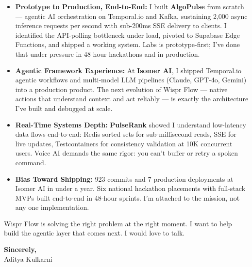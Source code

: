 \documentclass[11pt,letterpaper]{article}
\begin{document}
\begin{itemize}[leftmargin=*, itemsep=3pt, label={\color{WisprNavy}\faAngleRight}]
    \item \textbf{Prototype to Production, End-to-End:} I built \textbf{AlgoPulse} from scratch --- agentic AI orchestration on Temporal.io and Kafka, sustaining 2,000 async inference requests per second with sub-200ms SSE delivery to clients. I identified the API-polling bottleneck under load, pivoted to Supabase Edge Functions, and shipped a working system. Labs is prototype-first; I've done that under pressure in 48-hour hackathons and in production.

    \item \textbf{Agentic Framework Experience:} At \textbf{Isomer AI}, I shipped Temporal.io agentic workflows and multi-model LLM pipelines (Claude, GPT-4o, Gemini) into a production product. The next evolution of Wispr Flow --- native actions that understand context and act reliably --- is exactly the architecture I've built and debugged at scale.

    \item \textbf{Real-Time Systems Depth:} \textbf{PulseRank} showed I understand low-latency data flows end-to-end: Redis sorted sets for sub-millisecond reads, SSE for live updates, Testcontainers for consistency validation at 10K concurrent users. Voice AI demands the same rigor: you can't buffer or retry a spoken command.

    \item \textbf{Bias Toward Shipping:} 923 commits and 7 production deployments at Isomer AI in under a year. Six national hackathon placements with full-stack MVPs built end-to-end in 48-hour sprints. I'm attached to the mission, not any one implementation.
\end{itemize}

\vspace{6pt}

Wispr Flow is solving the right problem at the right moment. I want to help build the agentic layer that comes next. I would love to talk.

\vspace{12pt}

\textbf{Sincerely,}\\[8pt]
Aditya Kulkarni
\end{document}
